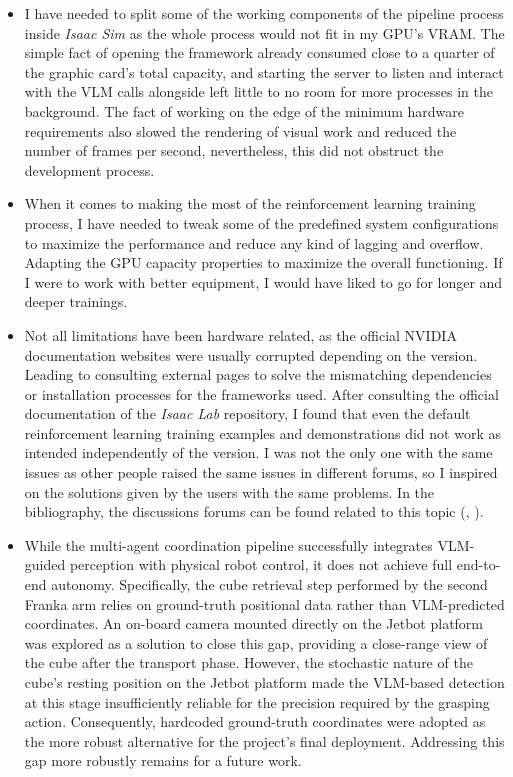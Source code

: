 \begin{itemize}
	\item I have needed to split some of the working components of the pipeline process inside \textit{Isaac Sim} as the whole process would not fit in my GPU's VRAM. The simple fact of opening the framework already consumed close to a quarter of the graphic card's total capacity, and starting the server to listen and interact with the VLM calls alongside left little to no room for more processes in the background. The fact of working on the edge of the minimum hardware requirements also slowed the rendering of visual work and reduced the number of frames per second, nevertheless, this did not obstruct the development process.
	
	\item When it comes to making the most of the reinforcement learning training process, I have needed to tweak some of the predefined system configurations to maximize the performance and reduce any kind of lagging and overflow. Adapting the GPU capacity properties to maximize the overall functioning. If I were to work with better equipment, I would have liked to go for longer and deeper trainings.
	
	\item Not all limitations have been hardware related, as the official NVIDIA documentation websites were usually corrupted depending on the version. Leading to consulting external pages to solve the mismatching dependencies or installation processes for the frameworks used. After consulting the official documentation of the \textit{Isaac Lab} repository, I found that even the default reinforcement learning training examples and demonstrations did not work as intended independently of the version. I was not the only one with the same issues as other people raised the same issues in different forums, so I inspired on the solutions given by the users with the same problems. In the bibliography, the discussions forums can be found related to this topic (\cite{GithubLiftQuestion}, \cite{NVIDIAFrankaQuestion}). 
	
	\item While the multi-agent coordination pipeline successfully integrates VLM-guided perception with 	physical robot control, it does not achieve full end-to-end autonomy. Specifically, the cube retrieval step performed by the second Franka arm relies on ground-truth positional data rather than VLM-predicted coordinates. An on-board camera mounted directly on the Jetbot platform was explored as a solution to close this gap, providing a close-range view of the cube after the transport phase. However, the stochastic nature of the cube's resting position on the Jetbot platform made the VLM-based detection at this stage insufficiently reliable for the precision required by the grasping action. Consequently, hardcoded ground-truth coordinates were adopted as the more robust alternative for the project's final deployment. Addressing this gap more robustly remains for a future work.
	
\end{itemize}

